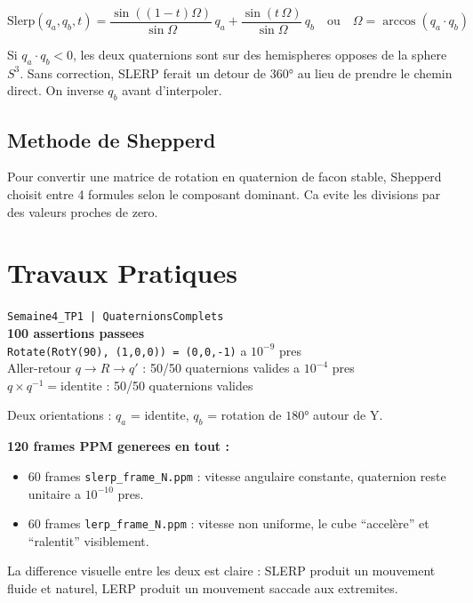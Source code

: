 \documentclass[12pt,a4paper]{report}
\newcommand{\code}[1]{\texttt{\textcolor{PrimaryBlue}{#1}}}
\begin{document}
\[
\text{Slerp}(q_a, q_b, t) = \frac{\sin((1-t)\Omega)}{\sin\Omega}\,q_a + \frac{\sin(t\,\Omega)}{\sin\Omega}\,q_b
\quad\text{ou}\quad
\Omega = \arccos(q_a \cdot q_b)
\]

\begin{warnbox}
Si $q_a \cdot q_b < 0$, les deux quaternions sont sur des hemispheres opposes de la sphere $S^3$. Sans correction, SLERP ferait un detour de 360$°$ au lieu de prendre le chemin direct. On inverse $q_b$ avant d'interpoler.
\end{warnbox}

\subsection*{Methode de Shepperd}

Pour convertir une matrice de rotation en quaternion de facon stable, Shepperd choisit entre 4 formules selon le composant dominant. Ca evite les divisions par des valeurs proches de zero.

\section{Travaux Pratiques}

\begin{tpbox}
\begin{resultbox}
\centering
\texttt{Semaine4\_TP1 | QuaternionsComplets}\\[4pt]
\textbf{100 assertions passees}\\[2pt]
\code{Rotate(RotY(90\textdegree), (1,0,0)) = (0,0,-1)} a $10^{-9}$ pres\\
Aller-retour $q \to R \to q'$ : 50/50 quaternions valides a $10^{-4}$ pres\\
$q \times q^{-1} = \text{identite}$ : 50/50 quaternions valides
\end{resultbox}
\end{tpbox}

\begin{tpbox}
Deux orientations : $q_a$ = identite, $q_b$ = rotation de $180°$ autour de Y.

\textbf{120 frames PPM generees en tout :}
\begin{itemize}
  \item 60 frames \code{slerp\_frame\_N.ppm} : vitesse angulaire constante, quaternion reste unitaire a $10^{-10}$ pres.
  \item 60 frames \code{lerp\_frame\_N.ppm} : vitesse non uniforme, le cube ``accelère'' et ``ralentit'' visiblement.
\end{itemize}

La difference visuelle entre les deux est claire : SLERP produit un mouvement fluide et naturel, LERP produit un mouvement saccade aux extremites.
\end{tpbox}
\end{document}
